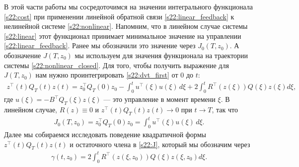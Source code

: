 \documentclass[../main.tex]{subfiles}
\begin{document}
В этой части работы мы сосредоточимся на значении интегрального функционала \eqref{s22:cost} при применении линейной обратной связи \eqref{s22:linear_feedback} к нелинейной системе \eqref{s22:nonlinear}.
Напомним, что в линейном случае системы \eqref{s22:linear} этот функционал принимает минимальное значение на управлении \eqref{s22:linear_feedback}.
Ранее мы обозначили это значение через $J_0(T,z_0)$.
А обозначение $J(T,z_0)$ мы используем для значения функционала на траектории системы \eqref{s22:nonlinear_closed}. 
Для того, чтобы получить выражение для $J(T,z_0)$ нам нужно проинтегрировать \eqref{s22:dvt_first} от $0$ до $t$:
\begin{gather}\label{s22:J}
 z^{\top}(t) Q_T(t)z(t) = z_0^{\top} Q_T(0)z_0 - \int_{0}^{t} u^{\top}(\xi) u(\xi) \, d\xi + 2\int_{0}^{t} R^{\top}(z(\xi))Q(\xi) z(\xi) d\xi,
\end{gather}
 где $ u(\xi) = -B^{\top} Q_T(\xi) z(\xi)$ --- это управление в момент времени $\xi$. 
В линейном случае, $R(z) \equiv 0$ и $z^{\top}(t) Q_T(t)z(t) \to 0 $ при $t \to T$, так что
\begin{gather*}
 J_0(T,z_0) = z_0^{\top} Q_T(0)z_0 = \int_{0}^{t} u^{\top}(\xi) u(\xi) \, d\xi.
\end{gather*}
Далее мы собираемся исследовать поведение квадратичной формы $z^{\top}(t) Q_T(t)z(t) $ и остаточного члена в \eqref{s22:J}, который мы обозначим через
\begin{gather*}
 \gamma (t,z_0) = 
 2\int_{0}^{t} R^{\top}(z(\xi,z_0))Q(\xi) z(\xi,z_0) d\xi.
\end{gather*}
\end{document}
